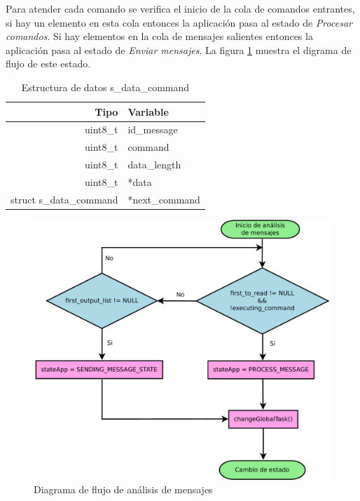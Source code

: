 Para atender cada comando se verifica el inicio de la cola de comandos entrantes, si hay un elemento en esta cola entonces la aplicación pasa al estado de \textit{Procesar comandos}. Si hay elementos en la cola de mensajes salientes entonces la aplicación pasa al estado de \textit{Enviar mensajes}. La figura \ref{fig:diagrama_flujo_analisis} muestra el digrama de flujo de este estado. 

\begin{table}
	\begin{center}
		\caption{Estructura de datos s\_data\_command}
		\label{tabla:s_data_command}
		\small
		\begin{tabular}{r|l}
			\toprule
			\textbf{Tipo} & \textbf{Variable}\\
			\midrule
			uint8\_t & id\_message \\
			uint8\_t & command \\
			uint8\_t & data\_length \\
			uint8\_t & *data \\
			struct s\_data\_command & *next\_command\\
			\bottomrule
		\end{tabular}
	\end{center}
\end{table}

\begin{figure}
	\centering
	\includegraphics[scale=0.35]{capitulo_3_imgs/analisis_mensajes_flujo.pdf}
	\caption{Diagrama de flujo de análisis de mensajes}
	\label{fig:diagrama_flujo_analisis}
\end{figure}


